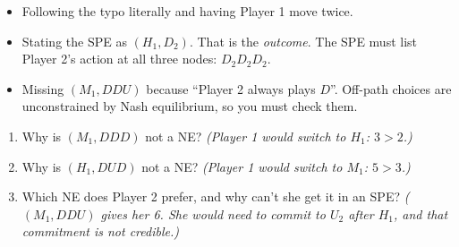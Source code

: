 \documentclass[11pt]{article}
\begin{document}
\begin{pitfall}
\begin{itemize}
\item Following the typo literally and having Player 1 move twice.
\item Stating the SPE as $(H_1,D_2)$. That is the \emph{outcome}. The SPE must list Player 2's action at all three nodes: $D_2D_2D_2$.
\item Missing $(M_1,DDU)$ because ``Player 2 always plays $D$''. Off-path choices are unconstrained by Nash equilibrium, so you must check them.
\end{itemize}
\end{pitfall}

\begin{selfcheck}
\begin{enumerate}
\item Why is $(M_1,DDD)$ not a NE? \emph{(Player 1 would switch to $H_1$: $3>2$.)}
\item Why is $(H_1,DUD)$ not a NE? \emph{(Player 1 would switch to $M_1$: $5>3$.)}
\item Which NE does Player 2 prefer, and why can't she get it in an SPE? \emph{($(M_1,DDU)$ gives her 6. She would need to commit to $U_2$ after $H_1$, and that commitment is not credible.)}
\end{enumerate}
\end{selfcheck}

\end{document}
